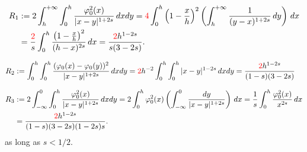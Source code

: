 \documentclass[11 pt]{article}
\numberwithin{equation}{section}
\newcommand{\B}[1]{{\color{red} #1}}  %
\begin{document}

\begin{align*}
	R_1 &:= 2\int_{h}^{+\infty}\int_{0}^{h} \frac{\varphi_0^2(x)}{|x-y|^{1+2s}}\,dxdy = \B{4}\int_{0}^{h}\left(1-\frac{x}{h}\right)^2\left(\int_{h}^{+\infty} \frac{1}{(y-x)^{1+2s}}\, dy\right)\,dx \\
	&= \frac{\B{2}}{s}\int_{0}^{h}\frac{\left(1-\frac{x}{h}\right)^2}{(h-x)^{2s}}\,dx
	=\frac{\B{2}h^{1-2 s}}{s(3-2 s)}.
\end{align*}

\begin{align*}
	R_2 &
	:= \int_{0}^{h}\int_{0}^{h} \frac{(\varphi_0(x)-\varphi_0(y))^2}{|x-y|^{1+2s}}\,dxdy
	= \B{2}h^{-2}\int_{0}^{h}\int_{0}^{h} |x-y|^{1-2s}\,dxdy
	=\frac{\B{2}h^{1-2 s}}{(1-s) (3-2 s)}
\end{align*}



\begin{align*}
	R_3 &:= 2\int_{-\infty}^{0}\int_{0}^{h} \frac{\varphi_0^2(x)}{|x-y|^{1+2s}}\,dxdy = 2\int_{0}^{h}\varphi_0^2(x)\left(\int_{-\infty}^{0} \frac{dy}{|x-y|^{1+2s}}\right)\,dx = \frac{1}{s}\int_{0}^{h}\frac{\varphi_0^2(x)}{x^{2s}}\,dx\\
	&=\frac{\B{2}h^{1-2 s}}{(1-s)(3-2 s) (1-2 s)s}.
\end{align*}
%
as long as $s<1/2$.
\end{document}

